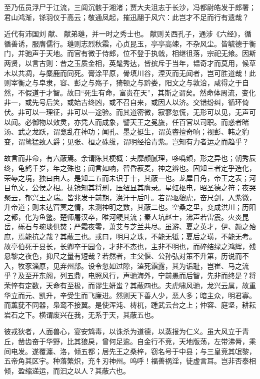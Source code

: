\documentclass[12pt,UTF8]{ctexbook}
\begin{document}
至乃伍员浮尸于江流，三闾沉骸于湘渚；贾大夫沮志于长沙，冯都尉皓发于郎署；君山鸿渐，铩羽仪于高云；敬通凤起，摧迅翮于风穴：此岂才不足而行有遗哉？

近代有沛国刘献、献弟璡，并一时之秀士也。献则关西孔子，通涉《六经》，循循善诱，服膺儒行。璡则志烈秋霜，心贞昆玉，亭亭高竦，不杂风尘。皆毓德于衡门，并驰声于天地。而官有微于侍郎，位不登于执戟，相继徂落，宗祀无飨。因斯两贤，以言古则：昔之玉质金相，英髦秀达，皆摈斥于当年，韫奇才而莫用，候草木以共凋，与麋鹿而同死。膏涂平原，骨填川谷，湮灭而无闻者，岂可胜道哉！此则宰衡之与皁隶，容、彭之与殇子，猗顿之与黔娄，阳文之与敦洽，咸得之于自然，不假道于才智。故曰“死生有命，富贵在天”，其斯之谓矣。然命体周流，变化非一，或先号后笑，或始吉终凶，或不召自来，或因人以济。交错纷纠，循环倚伏。非可以一理征，非可以一途验。而其道密微，寂寥忽慌，无形可以见，无声可以闻。必御物以效灵，亦凭人而成象，譬天王之冕旒，任百官以司职。而惑者睹汤、武之龙跃，谓龛乱在神功；闻孔、墨之挺生，谓英睿擅奇响；视彭、韩之豹变，谓鸷猛致人爵；见张、桓之硃绂，谓明经拾青紫。岂知有力者运之而趋乎？

故言而非命，有六蔽焉。余请陈其梗概：夫靡颜腻理，哆噅頞，形之异也；朝秀辰终，龟鹤千岁，年之殊也；闻言如响，智昏菽麦，神之辨也。固知三者定乎造化，荣辱之境，独曰由人。是知二五而未识于十，其蔽一也。龙犀日角，帝王之表；河目龟文，公侯之相。抚镜知其将刑，压纽显其膺录。星虹枢电，昭圣德之符；夜哭聚云，郁兴王之瑞。皆兆发于前期，涣汗于后叶。若谓驱貔虎，奋尺剑，入紫微，升帝道；则未达窅冥之情，未测神明之数，其蔽二也。空桑之里，变成洪川；历阳之都，化为鱼鳖。楚师屠汉卒，睢河鲠其流；秦人坑赵士，沸声若雷震。火炎昆岳，砾石与琬琰俱焚；严霜夜零，萧艾与芝兰共尽。虽游、夏之英才，伊、颜之殆庶，焉能抗之哉？其蔽三也。或曰，明月之珠，不能无牴；夏后之璜，不能无考。故亭伯死于县长，长卿卒于园令，才非不杰也，主非不明也，而碎结绿之鸿辉，残悬黎之夜色，抑尺之量有短哉？若然者，主父偃、公孙弘对策不升第，历说而不入，牧豕淄原，见弃州部。设令忽如过隙，溘死霜露，其为诟耻，岂崔、马之流乎？及至开东阁，列五鼎，电照风行，声驰海外，宁前愚而后智，先非而终是？将荣悴有定数，天命有至极，而谬生妍蚩？其蔽四也。夫虎啸风驰，龙兴云属，故重华立而元、凯升，辛受生而飞廉进。然则天下善人少，恶人多；暗主众，明君寡。而薰莸不同器，枭鸾不接翼。是使浑沌、梼杌，踵武云台之上；仲容、庭坚，耕耘岩石之下。横谓废兴在我，无系于天，其蔽五也。

彼戎狄者，人面兽心，宴安鸩毒，以诛杀为道德，以蒸报为仁义。虽大风立于青丘，凿齿奋于华野，比其狼戾，曾何足逾。自金行不竞，天地版荡，左带沸脣，乘间电发。遂覆瀍、洛，倾五都；居先王之桑梓，窃名号于中县；与三皇竞其氓黎，五帝角其区宇。种落繁炽，充牜刃神州。呜呼！福善祸淫，徒虚言耳。岂非否泰相倾，盈缩递运，而汩之以人？其蔽六也。
\end{document}
